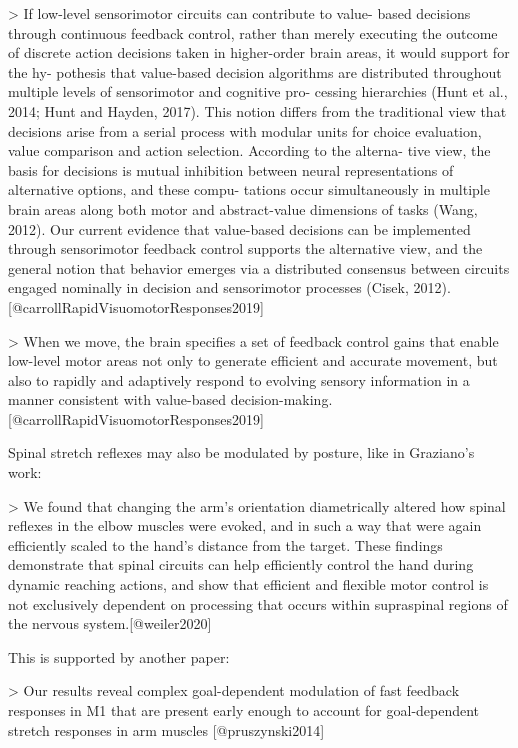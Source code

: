 \documentclass[../main.tex]{subfiles}
\begin{document}
{{> If low-level sensorimotor circuits can contribute to value- based decisions through continuous feedback control, rather than merely executing the outcome of discrete action decisions taken in higher-order brain areas, it would support for the hy- pothesis that value-based decision algorithms are distributed throughout multiple levels of sensorimotor and cognitive pro- cessing hierarchies (Hunt et al., 2014; Hunt and Hayden, 2017). This notion differs from the traditional view that decisions arise from a serial process with modular units for choice evaluation, value comparison and action selection. According to the alterna- tive view, the basis for decisions is mutual inhibition between neural representations of alternative options, and these compu- tations occur simultaneously in multiple brain areas along both motor and abstract-value dimensions of tasks (Wang, 2012). Our current evidence that value-based decisions can be implemented through sensorimotor feedback control supports the alternative view, and the general notion that behavior emerges via a distributed consensus between circuits engaged nominally in decision and sensorimotor processes (Cisek, 2012). [@carrollRapidVisuomotorResponses2019]


> When we move, the brain specifies a set of feedback control gains that enable low-level motor areas not only to generate efficient and accurate movement, but also to rapidly and adaptively respond to evolving sensory information in a manner consistent with value-based decision-making.[@carrollRapidVisuomotorResponses2019]


Spinal stretch reflexes may also be modulated by posture, like in Graziano's work:

> We found that changing the arm’s orientation diametrically altered how spinal reflexes in the elbow muscles were evoked, and in such a way that were again efficiently scaled to the hand’s distance from the target. These findings demonstrate that spinal circuits can help efficiently control the hand during dynamic reaching actions, and show that efficient and flexible motor control is not exclusively dependent on processing that occurs within supraspinal regions of the nervous system.[@weiler2020]

This is supported by another paper:

> Our results reveal complex goal-dependent modulation of fast feedback responses in M1 that are present early enough to account for goal-dependent stretch responses in arm muscles [@pruszynski2014]

}}
\end{document}
